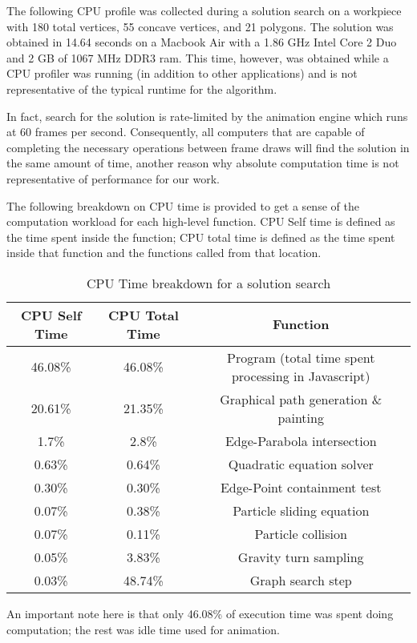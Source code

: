 The following CPU profile was collected during a solution search on a workpiece with 180 total vertices, 55 concave vertices, and 21 polygons. The solution was obtained in 14.64 seconds on a Macbook Air with a 1.86 GHz Intel Core 2 Duo and 2 GB of 1067 MHz DDR3 ram. This time, however, was obtained while a CPU profiler was running (in addition to other applications) and is not representative of the typical runtime for the algorithm.

In fact, search for the solution is rate-limited by the animation engine which runs at 60 frames per second. Consequently, all computers that are capable of completing the necessary operations between frame draws will find the solution in the same amount of time, another reason why absolute computation time is not representative of performance for our work.

The following breakdown on CPU time is provided to get a sense of the computation workload for each high-level function. CPU Self time is defined as the time spent inside the function; CPU total time is defined as the time spent inside that function and the functions called from that location.

\begin{table}[H]
\centering
\label{resultsTable}
\begin{tabular}{|c|c|c|}
\hline
CPU Self Time & CPU Total Time & Function \\ \hline
46.08\% & 46.08\% & Program (total time spent processing in Javascript) \\
20.61\% & 21.35\% & Graphical path generation \& painting \\
1.7\% & 2.8\% & Edge-Parabola intersection \\
0.63\% & 0.64\% & Quadratic equation solver \\
0.30\% & 0.30\% & Edge-Point containment test \\
0.07\% & 0.38\% & Particle sliding equation \\
0.07\% & 0.11\% & Particle collision \\
0.05\% & 3.83\% & Gravity turn sampling \\
0.03\% & 48.74\% & Graph search step \\
\hline
\end{tabular}
\caption{CPU Time breakdown for a solution search}
\end{table}

An important note here is that only 46.08\% of execution time was spent doing computation; the rest was idle time used for animation.

